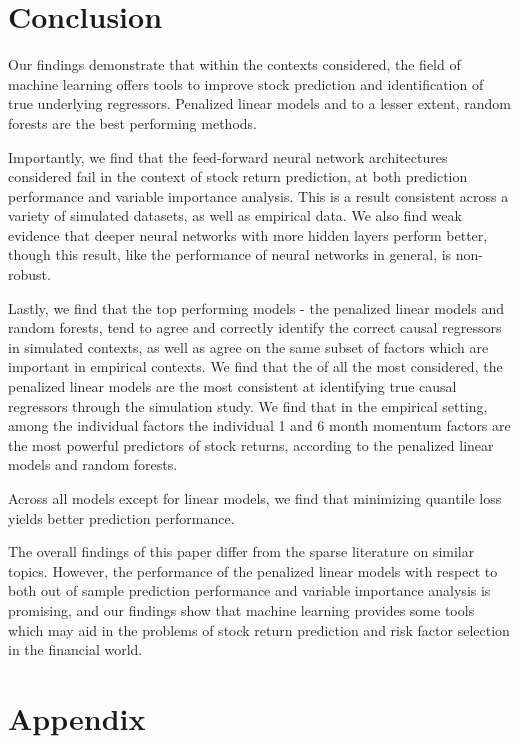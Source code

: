 \documentclass[11pt, a4paper, table]{article}
\begin{document}
\newpage

\section{Conclusion}

Our findings demonstrate that within the contexts considered, the field of machine learning offers tools to improve stock prediction and identification of true underlying regressors. Penalized linear models and to a lesser extent, random forests are the best performing methods.

Importantly, we find that the feed-forward neural network architectures considered fail in the context of stock return prediction, at both prediction performance and variable importance analysis. This is a result consistent across a variety of simulated datasets, as well as empirical data. We also find weak evidence that deeper neural networks with more hidden layers perform better, though this result, like the performance of neural networks in general, is non-robust.

Lastly, we find that the top performing models - the penalized linear models and random forests, tend to agree and correctly identify the correct causal regressors in simulated contexts, as well as agree on the same subset of factors which are important in empirical contexts. We find that the of all the most considered, the penalized linear models are the most consistent at identifying true causal regressors through the simulation study. We find that in the empirical setting, among the individual factors the individual 1 and 6 month momentum factors are the most powerful predictors of stock returns, according to the penalized linear models and random forests. 

Across all models except for linear models, we find that minimizing quantile loss yields better prediction performance.

The overall findings of this paper differ from the sparse literature on similar topics. However, the performance of the penalized linear models with respect to both out of sample prediction performance and variable importance analysis is promising, and our findings show that machine learning provides some tools which may aid in the problems of stock return prediction and risk factor selection in the financial world. 

\newpage

\section{Appendix}
\end{document}
